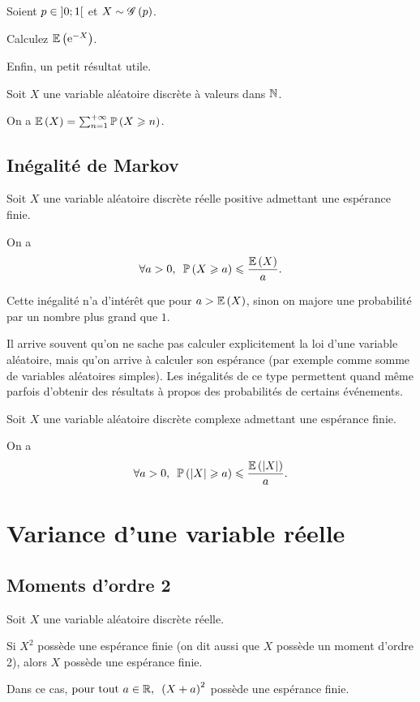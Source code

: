 \begin{exo}
Soient \(p\in\left]0;1\right[\) et \(X\sim\mathscr{G}\left(p\right)\).

Calculez \(\operatorname{\mathbb{E}}\left(\mathrm{e}^{-X}\right)\).
\end{exo}

Enfin, un petit résultat utile.

\begin{prop}
Soit \(X\) une variable aléatoire discrète à valeurs dans \(\mathbb{N}\).

On a \(\operatorname{\mathbb{E}}\left(X\right)=\sum_{n=1}^{+\infty}\mathbb{P}\left(X\geqslant n\right)\).
\end{prop}

\subsection{Inégalité de Markov}

\begin{prop}
Soit \(X\) une variable aléatoire discrète réelle positive admettant une espérance finie.

On a \[\quantifs{\forall a>0}\proba{X\geq a}\leq\dfrac{\esp{X}}{a}.\]
\end{prop}

Cette inégalité n'a d'intérêt que pour \(a>\operatorname{\mathbb{E}}\left(X\right)\), sinon on majore une probabilité par un nombre plus grand que \(1\).

Il arrive souvent qu'on ne sache pas calculer explicitement la loi d'une variable aléatoire, mais qu'on arrive à calculer son espérance (par exemple comme somme de variables aléatoires simples). Les inégalités de ce type permettent quand même parfois d'obtenir des résultats à propos des probabilités de certains événements.

\begin{cor}
Soit \(X\) une variable aléatoire discrète complexe admettant une espérance finie.

On a \[\quantifs{\forall a>0}\proba{\abs{X}\geq a}\leq\dfrac{\esp{\abs{X}}}{a}.\]
\end{cor}

\section{Variance d'une variable réelle}

\subsection{Moments d'ordre 2}

\begin{prop}
Soit \(X\) une variable aléatoire discrète réelle.

Si \(X^2\) possède une espérance finie (on dit aussi que \(X\) possède un moment d'ordre 2), alors \(X\) possède une espérance finie.

Dans ce cas, \(\quantifs{\tpt a\in\R}\paren{X+a}^2\) possède une espérance finie.
\end{prop}

